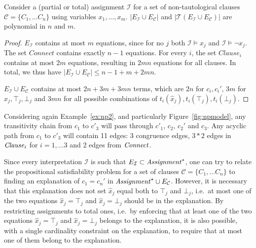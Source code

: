\documentclass[smallextended]{svjour3}
\begin{document}
\begin{lemma}
Consider a (partial or total) assignment $\mathcal{I}$ for a set of
non-tautological clauses $\mathcal{C}= \{C_1, \dots C_n\}$ using variables
$x_1,\ldots, x_m$. $|E_{\mathcal{I}} \cup E_\mathcal{C}|$ and
$|\mathcal{T}(E_{\mathcal{I}} \cup E_\mathcal{C})|$ are polynomial in $n$ and
$m$.

\begin{proof}
$E_{\mathcal{I}}$ contains at most $m$ equations, since for no $j$ both $\mathcal{I} \models x_j$ and $\mathcal{I} \models \neg x_j$.
The set $Connect$ contains exactly $n-1$ equations.
For every $i$, the set $Clause_i$ contains at most $2m$ equations, resulting in $2mn$ equations for all clauses.
In total, we thus have $|E_{\mathcal{I}} \cup E_\mathcal{C}| \leq n-1 + m + 2mn$.

$E_{\mathcal{I}} \cup E_\mathcal{C}$ contains at most $2n + 3m + 3mn$ terms, which are $2n$ for $c_i,c_i'$, $3m$ for $\hat{x}_j,\top_j,\bot_j$ and $3mn$ for all possible combinations of $t_i(\hat{x}_j),t_i(\top_j),t_i(\bot_j)$.
\end{proof}
\end{lemma}

\noindent 
Considering again Example~\ref{ex:np2}, and particularly
Figure~\ref{fig:npmodel}, any transitivity chain from $c_1$ to
$c'_3$ will pass through $c'_1$, $c_2$, $c_2'$ and
$c_3$.  Any acyclic path from $c_1$ to $c'_3$ will contain 11
edges: 3 congruence edges, $3*2$ edges in ${\it Clause}_i$ for $i=1,\dots 3$
and 2 edges from ${\it Connect}$.

Since every interpretation $\mathcal{I}$ is such that $E_{\mathcal{I}} \subset
{\it Assignment}^\star$, one can try to relate the propositional satisfiability
problem for a set of clauses $\mathcal{C}= \{C_1, \dots C_n\}$ to finding an
explanation of $c_1 = c_n'$ in ${\it Assignment}^\star \cup
E_{\mathcal{C}}$.  However, it is necessary that this explanation does not set
$\hat{x}_j$ equal both to $\top_j$ and $\bot_j$, i.e.\ at most one of the two
equations $\hat{x}_j = \top_j$ and $\hat{x}_j = \bot_j$ should be in the
explanation.  By restricting assignments to total ones, i.e.\ by enforcing that
at least one of the two equations $\hat{x}_j = \top_j$ and $\hat{x}_j = \bot_j$
belongs to the explanation, it is also possible, with a single cardinality
constraint on the explanation, to require that at most one of them belong to the
explanation.
\end{document}
